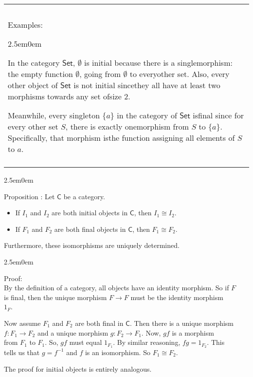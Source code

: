 \documentclass{book}
\newcommand{\hTwo}{%
   \color{MidnightBlue}%
   \fontsize{13}{15}\selectfont%
}
\newcommand{\hThree}{%
   \color{PineGreen!85!Orange}
   \fontsize{13}{15}\selectfont%
}
\newcommand{\exOne}{%
   \color{Purple}%
   \fontsize{14}{16}\selectfont%
}
\newcommand{\exTwo}{%
   \color{RedViolet}%
   \fontsize{13}{15}\selectfont%
}
\newenvironment{myIndent}{%
   \begin{adjustwidth}{2.5em}{0em}%
}{%
   \end{adjustwidth}%
}
\newcommand{\mcateg}[1]{\mathsf{#1}}
\newcounter{PropNumber}
\newcommand{\propCount}{%
   \stepcounter{PropNumber}%
   \thePropNumber%
}
\newenvironment{myClosureOne}[2][.]{%
   \color{#1}%
   \begin{tabular}{|p{#2in}|} \hline \\%
}{%
   \\ \hline \end{tabular}%
}
\newcommand{\retTwo}{\hfill\bigbreak}
\begin{document}
{\begin{center}\exOne
   \begin{myClosureOne}{5}
      \\ [-24pt]
      Examples:
      \begin{myIndent} \exTwo
         In the category $\mcateg{Set}$, $\emptyset$ is initial because there is a single\newline morphism: the empty function $\emptyset$, going from $\emptyset$ to every\newline other set. Also, every other object of $\mcateg{Set}$ is not initial since\newline they all have at least two morphisms towards any set of\newline size 2.\retTwo

         Meanwhile, every singleton $\{a\}$ in the category of $\mcateg{Set}$ is\newline final since for every other set $S$, there is exactly one\newline morphism from $S$ to $\{a\}$. Specifically, that morphism is\newline the function assigning all elements of $S$ to $a$.
      \end{myIndent}
      \\ [-16.4pt]
   \end{myClosureOne}\retTwo
\end{center}}

{\begin{myIndent} \hTwo
   Proposition \propCount: Let $\mcateg{C}$ be a category.
   \begin{itemize}
      \item If $I_1$ and $I_2$ are both initial objects in $\mcateg{C}$, then $I_1 \cong I_2$.
      \item If $F_1$ and $F_2$ are both final objects in $\mcateg{C}$, then $F_1 \cong F_2$.
   \end{itemize}
   Furthermore, these isomorphisms are uniquely determined.

   {\begin{myIndent} \hThree
      Proof:\\
      By the definition of a category, all objects have an identity morphism. So if $F$\\ is final, then the unique morphism $F \longrightarrow F$ must be the identity morphism\\ $1_F$.\retTwo

      Now assume $F_1$ and $F_2$ are both final in $\mcateg{C}$. Then there is a unique morphism\\ $f: F_1 \longrightarrow F_2$ and a unique morphism $g: F_2 \longrightarrow F_1$. Now, $gf$ is a morphism\\ from $F_1$ to $F_1$. So, $gf$ must equal $1_{F_1}$. By similar reasoning, $fg = 1_{F_2}$. This\\ tells us that $g = f^{-1}$ and $f$ is an isomorphism. So $F_1 \cong F_2$.

      \newpage

      The proof for initial objects is entirely analogous. \retTwo
   \end{myIndent}}
\end{myIndent}}
\end{document}
